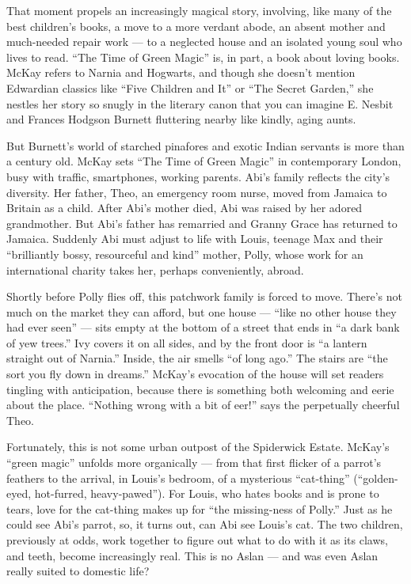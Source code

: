 That moment propels an increasingly magical story, involving, like many
of the best children's books, a move to a more verdant abode, an absent
mother and much-needed repair work --- to a neglected house and an
isolated young soul who lives to read. ``The Time of Green Magic'' is,
in part, a book about loving books. McKay refers to Narnia and Hogwarts,
and though she doesn't mention Edwardian classics like ``Five Children
and It'' or ``The Secret Garden,'' she nestles her story so snugly in
the literary canon that you can imagine E. Nesbit and Frances Hodgson
Burnett fluttering nearby like kindly, aging aunts.

But Burnett's world of starched pinafores and exotic Indian servants is
more than a century old. McKay sets ``The Time of Green Magic'' in
contemporary London, busy with traffic, smartphones, working parents.
Abi's family reflects the city's diversity. Her father, Theo, an
emergency room nurse, moved from Jamaica to Britain as a child. After
Abi's mother died, Abi was raised by her adored grandmother. But Abi's
father has remarried and Granny Grace has returned to Jamaica. Suddenly
Abi must adjust to life with Louis, teenage Max and their ``brilliantly
bossy, resourceful and kind'' mother, Polly, whose work for an
international charity takes her, perhaps conveniently, abroad.

Shortly before Polly flies off, this patchwork family is forced to move.
There's not much on the market they can afford, but one house --- ``like
no other house they had ever seen'' --- sits empty at the bottom of a
street that ends in ``a dark bank of yew trees.'' Ivy covers it on all
sides, and by the front door is ``a lantern straight out of Narnia.''
Inside, the air smells ``of long ago.'' The stairs are ``the sort you
fly down in dreams.'' McKay's evocation of the house will set readers
tingling with anticipation, because there is something both welcoming
and eerie about the place. ``Nothing wrong with a bit of eer!'' says the
perpetually cheerful Theo.

Fortunately, this is not some urban outpost of the Spiderwick Estate.
McKay's ``green magic'' unfolds more organically --- from that first
flicker of a parrot's feathers to the arrival, in Louis's bedroom, of a
mysterious ``cat-thing'' (``golden-eyed, hot-furred, heavy-pawed''). For
Louis, who hates books and is prone to tears, love for the cat-thing
makes up for ``the missing-ness of Polly.'' Just as he could see Abi's
parrot, so, it turns out, can Abi see Louis's cat. The two children,
previously at odds, work together to figure out what to do with it as
its claws, and teeth, become increasingly real. This is no Aslan --- and
was even Aslan really suited to domestic life?


